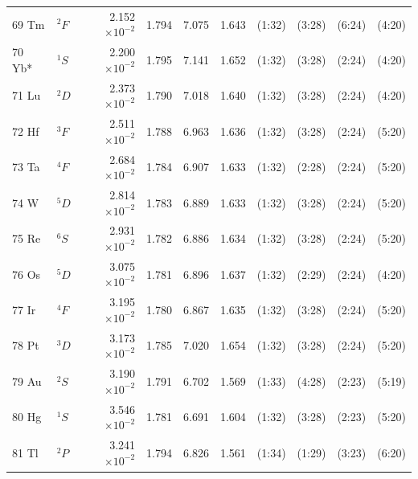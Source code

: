 \begin{longtable}{l l r r r r r r r r}
69 Tm 	&  	$^{2}F$   	&   	2.152$\times10^{-2}$   	&   	1.794   	&   	7.075   	&   	1.643   	&   	(1:32)   	&   	(3:28)   	&   	(6:24)   	&   	(4:20)     	\\
70 Yb* 	&  	$^{1}S$   	&   	2.200$\times10^{-2}$   	&   	1.795   	&   	7.141   	&   	1.652   	&   	(1:32)   	&   	(3:28)   	&   	(2:24)   	&   	(4:20)     	\\   	
71 Lu 	&  	$^{2}D$   	&   	2.373$\times10^{-2}$   	&   	1.790   	&   	7.018   	&   	1.640   	&   	(1:32)   	&   	(3:28)   	&   	(2:24)   	&   	(4:20)     	\\   	
72 Hf 	& 	$^{3}F$   	&   	2.511$\times10^{-2}$   	&   	1.788   	&   	6.963   	&   	1.636   	&   	(1:32)   	&   	(3:28)   	&   	(2:24)   	&   	(5:20)     	\\   	
73 Ta 	& 	$^{4}F$   	&   	2.684$\times10^{-2}$   	&   	1.784   	&   	6.907   	&   	1.633   	&   	(1:32)   	&   	(2:28)   	&   	(2:24)   	&   	(5:20)     	\\   	
74 W 	& 	$^{5}D$   	&   	2.814$\times10^{-2}$   	&   	1.783   	&   	6.889   	&   	1.633   	&   	(1:32)   	&   	(3:28)   	&   	(2:24)   	&   	(5:20)     	\\   	
75 Re 	&	$^{6}S$   	&   	2.931$\times10^{-2}$   	&   	1.782   	&   	6.886   	&   	1.634   	&   	(1:32)   	&   	(3:28)   	&   	(2:24)   	&   	(5:20)     	\\   	
76 Os 	&  	$^{5}D$   	&   	3.075$\times10^{-2}$   	&   	1.781   	&   	6.896   	&   	1.637   	&   	(1:32)   	&   	(2:29)   	&   	(2:24)   	&   	(4:20)     	\\   	
77 Ir 		&  	$^{4}F$   	&   	3.195$\times10^{-2}$   	&   	1.780   	&   	6.867   	&   	1.635   	&   	(1:32)   	&   	(3:28)   	&   	(2:24)   	&   	(5:20)  	\\   	
78 Pt 	&  	$^{3}D$   	&   	3.173$\times10^{-2}$   	&   	1.785   	&   	7.020   	&   	1.654   	&   	(1:32)   	&   	(3:28)   	&   	(2:24)   	&   	(5:20)  	\\   	
79 Au 	&  	$^{2}S$   	&   	3.190$\times10^{-2}$   	&   	1.791   	&   	6.702   	&   	1.569   	&   	(1:33)   	&   	(4:28)   	&   	(2:23)   	&   	(5:19)  	\\   	
80 Hg 	&  	$^{1}S$   	&   	3.546$\times10^{-2}$   	&   	1.781   	&   	6.691   	&   	1.604   	&   	(1:32)   	&   	(3:28)   	&   	(2:23)   	&   	(5:20) 	\\   	
81 Tl 	&  	$^{2}P$   	&   	3.241$\times10^{-2}$   	&   	1.794   	&   	6.826   	&   	1.561   	&   	(1:34)   	&   	(1:29)   	&   	(3:23)   	&   	(6:20) 	\\   	

\end{longtable}
